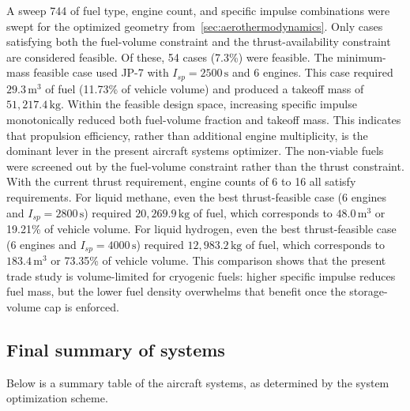 \documentclass[10pt,a4paper]{article}
\begin{document}
A sweep 744 of fuel type, engine count, and specific impulse combinations were swept for the optimized geometry from~\cref{sec:aerothermodynamics}. Only cases satisfying both the fuel-volume constraint and the thrust-availability constraint are considered feasible. Of these, 54 cases (7.3\%) were feasible. The minimum-mass feasible case used JP-7 with $I_{sp}=2500\,\mathrm{s}$ and 6 engines. This case required $29.3\,\mathrm{m}^{3}$ of fuel (11.73\% of vehicle volume) and produced a takeoff mass of $51,217.4\,\mathrm{kg}$. Within the feasible design space, increasing specific impulse monotonically reduced both fuel-volume fraction and takeoff mass. This indicates that propulsion efficiency, rather than additional engine multiplicity, is the dominant lever in the present aircraft systems optimizer. The non-viable fuels were screened out by the fuel-volume constraint rather than the thrust constraint. With the current thrust requirement, engine counts of 6 to 16 all satisfy requirements. For liquid methane, even the best thrust-feasible case (6 engines and $I_{sp}=2800\,\mathrm{s}$) required $20,269.9\,\mathrm{kg}$ of fuel, which corresponds to $48.0\,\mathrm{m}^{3}$ or 19.21\% of vehicle volume. For liquid hydrogen, even the best thrust-feasible case (6 engines and $I_{sp}=4000\,\mathrm{s}$) required $12,983.2\,\mathrm{kg}$ of fuel, which corresponds to $183.4\,\mathrm{m}^{3}$ or 73.35\% of vehicle volume. This comparison shows that the present trade study is volume-limited for cryogenic fuels: higher specific impulse reduces fuel mass, but the lower fuel density overwhelms that benefit once the storage-volume cap is enforced.

\subsection{Final summary of systems}
Below is a summary table of the aircraft systems, as determined by the system optimization scheme.
\end{document}
